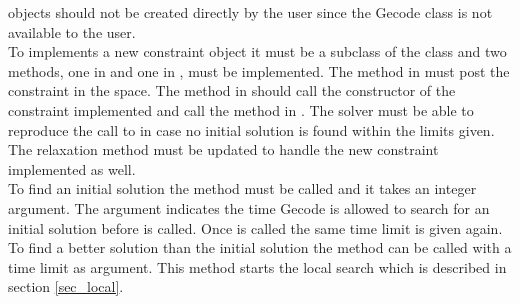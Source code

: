 objects should not be created directly by the user since the Gecode  class is not available to the 
user. \\ 
To implements a new constraint object it must be a subclass of the  class and two methods, one in 
 and one in , must be implemented. The method in  must post the 
constraint in the  space. The method in  should call the constructor of the 
constraint implemented and call the method in . The solver must 
be able to reproduce the call to  in case no initial solution is found within the limits given. The 
relaxation method must be updated to handle the new constraint implemented as well. \\
To find an initial solution the method  must be called and it takes an integer argument. The 
argument indicates the time Gecode is allowed to search for an initial solution before  is called. Once 
 is called the same time limit is given again. \\
To find a better solution than the initial solution the method  can be called with a time 
limit as argument. This method starts the local search which is described in section \ref{sec_local}. 